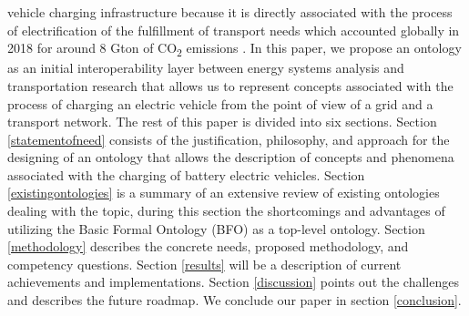 vehicle charging infrastructure because it is directly associated with the
process of electrification of the fulfillment of transport needs which accounted
globally in 2018 for around 8 Gton of CO\textsubscript{2} emissions
\cite{IEA.2023}. In this paper, we propose an ontology as an initial
interoperability layer between energy systems analysis and transportation
research that allows us to represent concepts associated with the process of
charging an electric vehicle from the point of view of a grid and a transport
network. The rest of this paper is divided into six sections. Section
\ref{statementofneed} consists of the justification, philosophy, and approach for
the designing of an ontology that allows the description of concepts and
phenomena associated with the charging of battery electric vehicles. Section
\ref{existingontologies} is a summary of an extensive review of existing
ontologies dealing with the topic, during this section the shortcomings and
advantages of utilizing the Basic Formal Ontology (BFO) \cite{Arp.2015} as a
top-level ontology. Section \ref{methodology} describes the concrete needs,
proposed methodology, and competency questions. Section \ref{results} will be a
description of current achievements and implementations. Section
\ref{discussion} points out the challenges and describes the future roadmap. We
conclude our paper in section \ref{conclusion}.

